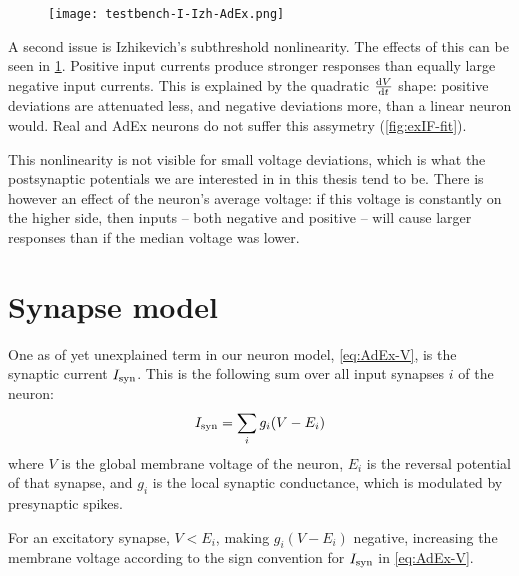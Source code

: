 \begin{figure}
    \hspace*{-2em}
    \texttt{[image: testbench-I-Izh-AdEx.png]}
    \label{fig:testbench-I-Izh-AdEx}
\end{figure}

A second issue is Izhikevich's subthreshold nonlinearity. The effects of this can be seen in \cref{fig:testbench-I-Izh-AdEx}. Positive input currents produce stronger responses than equally large negative input currents. This is explained by the quadratic $\frac{\mathrm{d}V}{\mathrm{d}t}$ shape: positive deviations are attenuated less, and negative deviations more, than a linear neuron would. Real and AdEx neurons do not suffer this assymetry (\cref{fig:exIF-fit}).

This nonlinearity is not visible for small voltage deviations, which is what the postsynaptic potentials we are interested in in this thesis tend to be. There is however an effect of the neuron's average voltage: if this voltage is constantly on the higher side, then inputs -- both negative and positive -- will cause larger responses than if the median voltage was lower.


\clearpage
\section{Synapse model}
\label{sec:synapse_model}

One as of yet unexplained term in our neuron model, \cref{eq:AdEx-V}, is the synaptic current $I_{\text{syn}}$.
This is the following sum over all input synapses $i$ of the neuron:
\begin{equation}
    I_{\text{syn}} = \sum_i g_i (V - E_i)
    \label{eq:I_syn}
\end{equation}
where $V$ is the global membrane voltage of the neuron, $E_i$ is the reversal potential of that synapse, and $g_i$ is the local synaptic conductance, which is modulated by presynaptic spikes.

For an excitatory synapse, $V < E_i$, making $g_i (V - E_i)$ negative, increasing the membrane voltage according to the sign convention for $I_{\text{syn}}$ in \cref{eq:AdEx-V}.

